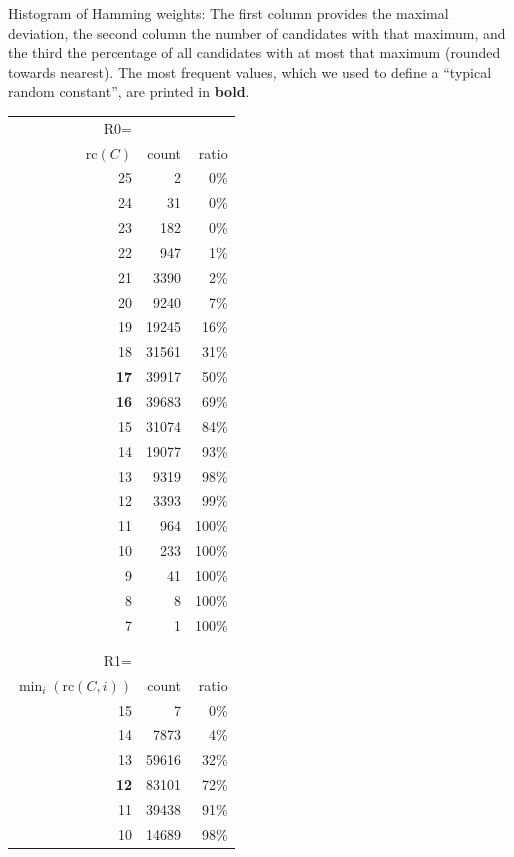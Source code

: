 \documentclass[11pt,twoside]{article}
\begin{document}
\begin{table}[htbp]
  \caption{Histogram of Hamming weights: 
    The first column provides the maximal deviation, the second column the 
    number
    of candidates with that maximum, and the third the percentage of all
    candidates with at most that maximum (rounded towards nearest). The most
    frequent values, which we used to define a ``typical random constant'',
    are printed in \textbf{bold}.}

  \label{tab:hammingweighthisto}
\end{table}

\begin{table}[htbp]
  \centering
  \begin{tabular}{rrr}
\hline
R0=\\
    $\mbox{rc}(C)$ & count & ratio\\
\hline
 25 &      2 &  0\% \\
 24 &     31 &  0\% \\
 23 &    182 &  0\% \\
 22 &    947 &  1\% \\
 21 &   3390 &  2\% \\
 20 &   9240 &  7\% \\
 19 &  19245 & 16\% \\
 18 &  31561 & 31\% \\
 \textbf{17} &  39917 & 50\% \\
 \textbf{16} &  39683 & 69\% \\
 15 &  31074 & 84\% \\
 14 &  19077 & 93\% \\
 13 &   9319 & 98\% \\
 12 &   3393 & 99\% \\
 11 &    964 &100\% \\
 10 &    233 &100\% \\
  9 &     41 &100\% \\
  8 &      8 &100\% \\
  7 &      1 &100\% \\
\\ \\
\hline
R1=\\
$\min_i(\mbox{rc}(C,i))$  & count & ratio\\
\hline
 15 &      7 &  0\% \\
 14 &   7873 &  4\% \\
 13 &  59616 & 32\% \\
 \textbf{12} &  83101 & 72\% \\
 11 &  39438 & 91\% \\
 10 &  14689 & 98\% \\

\end{tabular}
\end{table}
\end{document}
